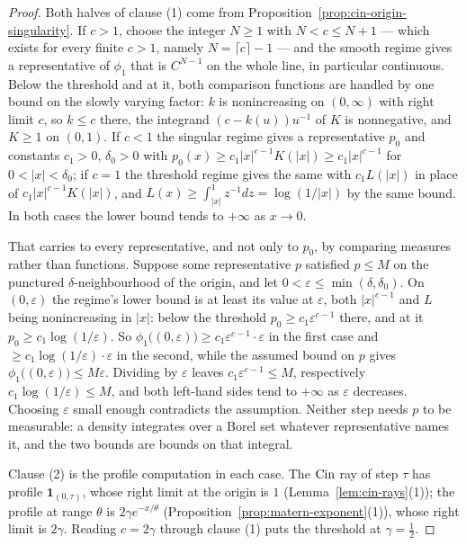 \begin{proof}
Both halves of clause (1) come from Proposition~\ref{prop:cin-origin-singularity}. If $c > 1$, choose the
integer $N \ge 1$ with $N < c \le N+1$ --- which exists for every finite $c > 1$, namely
$N = \lceil c\rceil - 1$ --- and the smooth regime gives a representative of $\phi_1$ that is
$C^{N-1}$ on the whole line, in particular continuous. Below the threshold and at it, both
comparison functions are handled by one bound on the slowly varying factor: $k$ is nonincreasing
on $(0,\infty)$ with right limit $c$, so $k \le c$ there, the integrand $(c-k(u))u^{-1}$ of $K$ is
nonnegative, and $K \ge 1$ on $(0,1)$. If $c < 1$ the singular regime gives a
representative $p_0$ and constants $c_1 > 0$, $\delta_0 > 0$ with
$p_0(x) \ge c_1|x|^{c-1}K(|x|) \ge c_1|x|^{c-1}$ for $0 < |x| < \delta_0$; if $c = 1$ the
threshold regime gives the same with $c_1 L(|x|)$ in place of $c_1|x|^{c-1}K(|x|)$, and
$L(x) \ge \int_{|x|}^1 z^{-1}dz = \log(1/|x|)$ by the same bound. In both cases
the lower bound tends to $+\infty$ as $x \to 0$.

That carries to every representative, and not only to $p_0$, by comparing measures rather than
functions. Suppose some representative $p$ satisfied $p \le M$ on the punctured
$\delta$-neighbourhood of the origin, and let $0 < \varepsilon \le \min(\delta,\delta_0)$. On
$(0,\varepsilon)$ the regime's lower bound is at least its value at $\varepsilon$, both
$|x|^{c-1}$ and $L$ being nonincreasing in $|x|$: below the threshold
$p_0 \ge c_1\varepsilon^{c-1}$ there, and at it $p_0 \ge c_1\log(1/\varepsilon)$. So
$\phi_1\bigl((0,\varepsilon)\bigr) \ge c_1\varepsilon^{c-1}\cdot\varepsilon$ in the first case
and $\ge c_1\log(1/\varepsilon)\cdot\varepsilon$ in the second, while the assumed bound on $p$
gives $\phi_1\bigl((0,\varepsilon)\bigr) \le M\varepsilon$. Dividing by $\varepsilon$ leaves
$c_1\varepsilon^{c-1} \le M$, respectively $c_1\log(1/\varepsilon) \le M$, and both left-hand
sides tend to $+\infty$ as $\varepsilon$ decreases. Choosing $\varepsilon$ small enough
contradicts the assumption. Neither step needs $p$ to be measurable: a density integrates over a
Borel set whatever representative names it, and the two bounds are bounds on that integral.

Clause (2) is the profile computation in each case. The $\operatorname{Cin}$ ray of step $\tau$ has profile
$\mathbf 1_{(0,\tau)}$, whose right limit at the origin is $1$ (Lemma~\ref{lem:cin-rays}(1)); the
\Matern{} profile at range $\theta$ is $2\gamma e^{-x/\theta}$ (Proposition~\ref{prop:matern-exponent}(1)),
whose right limit is $2\gamma$. Reading $c = 2\gamma$ through clause (1) puts the threshold at
$\gamma = \tfrac12$.
\end{proof}

